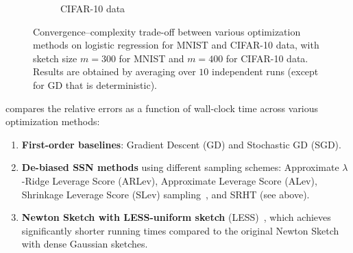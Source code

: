 \documentclass[11pt,a4paper]{article}
\begin{document}
\begin{figure}[thb]
\begin{subfigure}[c]{0.48\textwidth}
\captionsetup{font=scriptsize}
 \caption{CIFAR-10 data}
  \end{subfigure}

 
\caption{{
Convergence--complexity trade-off between various optimization methods on logistic regression for MNIST and CIFAR-10 data, with sketch size  $m=300$ for MNIST and $m=400$ for CIFAR-10 data. 
Results are obtained by averaging over $10$ independent runs (except for GD that is deterministic). 
}}

\label{fig:convergence_time}
\end{figure}


 
 compares the relative errors as a function of wall-clock time across various optimization methods:
\begin{enumerate}
  \item \textbf{First-order baselines}: Gradient Descent (GD) and Stochastic GD (SGD).
  \item \textbf{De-biased SSN methods} using different sampling schemes: Approximate $\lambda$-Ridge Leverage Score (ARLev), Approximate Leverage Score (ALev), Shrinkage Leverage Score (SLev) sampling~\citep{ma2015statistical}, and SRHT (see  above).
  \item \textbf{Newton Sketch with LESS-uniform sketch} (LESS)~\citep{derezinski2021newtonless}, which achieves significantly shorter running times compared to the original Newton Sketch with dense Gaussian sketches.
\end{enumerate}
\end{document}
